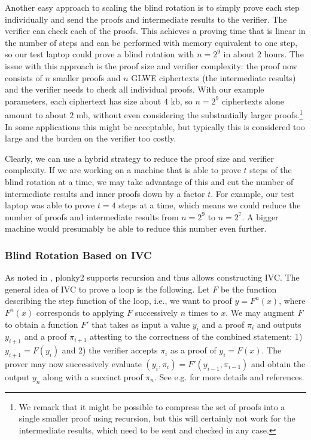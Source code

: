 \documentclass[9pt]{extarticle}
\begin{document}
Another easy approach to scaling the blind rotation is to simply prove each step individually and send the proofs and intermediate results to the verifier. The verifier can check each of the proofs. This achieves a proving time that is linear in the number of steps and can be performed with memory equivalent to one step, so our test laptop could prove a blind rotation with $n=2^9$ in about $2$ hours. The issue with this approach is the proof size and verifier complexity: the proof now consists of $n$ smaller proofs and $n$ GLWE ciphertexts (the intermediate results) and the verifier needs to check all individual proofs. With our example parameters, each ciphertext has size about $4$ kb, so $n=2^9$ ciphertexts alone amount to about $2$ mb, without even considering the substantially larger proofs.\footnote{We remark that it might be possible to compress the set of proofs into a single smaller proof using recursion, but this will certainly not work for the intermediate results, which need to be sent and checked in any case.} In some applications this might be acceptable, but typically this is considered too large and the burden on the verifier too costly.

Clearly, we can use a hybrid strategy to reduce the proof size and verifier complexity. If we are working on a machine that is able to prove $t$ steps of the blind rotation at a time, we may take advantage of this and cut the number of intermediate results and inner proofs down by a factor $t$. For example, our test laptop was able to prove $t=4$ steps at a time, which means we could reduce the number of proofs and intermediate results from $n=2^9$ to $n=2^7$. A bigger machine would presumably be able to reduce this number even further.

\subsubsection{Blind Rotation Based on IVC}
\label{sec:ivc}
As noted in , plonky2 supports recursion and thus allows constructing IVC. The general idea of IVC to prove a loop is the following. Let $F$ be the function describing the step function of the loop, i.e., we want to proof $y = F^{n}(x)$, where $F^{n}(x)$ corresponds to applying $F$ successively $n$ times to $x$. We may augment $F$ to obtain a function $F'$ that takes as input a value $y_i$ and a proof $\pi_i$ and outputs $y_{i+1}$ and a proof $\pi_{i+1}$ attesting to the correctness of the combined statement: 1) $y_{i+1} = F(y_i)$ and 2) the verifier accepts $\pi_i$ as a proof of $y_{i} = F(x)$. The prover may now successively evaluate $(y_i, \pi_i) = F'(y_{i-1}, \pi_{i-1})$ and obtain the output $y_{n}$ along with a succinct proof $\pi_{n}$. See e.g. \cite{DBLP:journals/ftsec/Thaler22} for more details and references.
\end{document}
